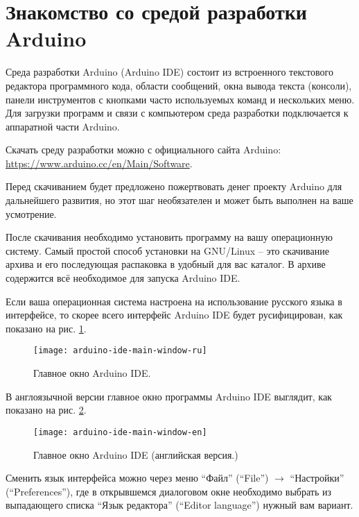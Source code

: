 \documentclass[../main.tex]{subfiles}
\begin{document}
\section{Знакомство со средой разработки Arduino}
Среда разработки Arduino (Arduino IDE) состоит из встроенного текстового
редактора программного кода, области сообщений, окна вывода текста (консоли),
панели инструментов с кнопками часто используемых команд и нескольких меню. Для
загрузки программ и связи с компьютером среда разработки подключается к
аппаратной части Arduino.

Скачать среду разработки можно с официального сайта Arduino:
\url{https://www.arduino.cc/en/Main/Software}.

Перед скачиванием будет предложено пожертвовать денег проекту Arduino для
дальнейшего развития, но этот шаг необязателен и может быть выполнен на ваше
усмотрение.

После скачивания необходимо установить программу на вашу операционную систему.
Самый простой способ установки на GNU/Linux -- это скачивание архива и его
последующая распаковка в удобный для вас каталог.  В архиве содержится всё
необходимое для запуска Arduino IDE.

Если ваша операционная система настроена на использование русского языка в
интерфейсе, то скорее всего интерфейс Arduino IDE будет русифицирован, как
показано на рис. \ref{fig:arduino-ide-main-window-ru}.

\begin{figure}[ht]
  \centering
  \caption{Главное окно Arduino IDE.}
  \texttt{[image: arduino-ide-main-window-ru]}
  \label{fig:arduino-ide-main-window-ru}
\end{figure}

В англоязычной версии главное окно программы Arduino IDE выглядит, как показано
на рис. \ref{fig:arduino-ide-main-window-en}.

\begin{figure}[ht]
  \centering
  \caption{Главное окно Arduino IDE (английская версия.)}
  \texttt{[image: arduino-ide-main-window-en]}
  \label{fig:arduino-ide-main-window-en}
\end{figure}

Сменить язык интерфейса можно через меню ``Файл'' (``File'') $\rightarrow$
``Настройки'' (``Preferences''), где в открывшемся диалоговом окне необходимо
выбрать из выпадающего списка ``Язык редактора'' (``Editor language'') нужный
вам вариант.
\end{document}
